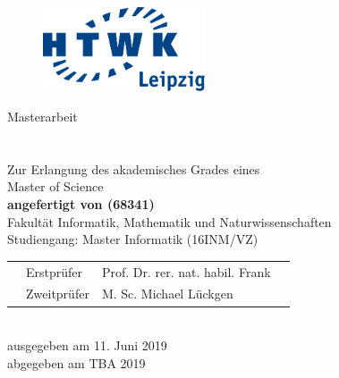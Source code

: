 \makeatletter
\begin{titlepage}
  \vspace{1cm}

  \begin{figure}[h!]
    \centering
    \includegraphics[height=2.5cm]{src/Title/logo_htwk.pdf}
  \end{figure}

  \begin{center}
    \vspace{1cm}

    \begin{onehalfspacing}
      {\Large Masterarbeit} \\[8ex]
      \textbf{
        {\Huge \@title} \\[5ex]
        {\Large \@subtitle} \\[8ex]
      }
      \large
      Zur Erlangung des akademisches Grades eines \\
      Master of Science \\[5ex]
      \vfill
      \textbf{angefertigt von \@author{ }(68341)}\\[5ex]
      \vfill
      Fakultät Informatik, Mathematik und Naturwissenschaften\\
      Studiengang: Master Informatik (16INM/VZ)\\[5ex]
      \vfill
      \begin{tabularx}{\textwidth}{Xm{2.5cm}lX}
        & Erstprüfer & Prof. Dr. rer. nat. habil. Frank &\\
        & Zweitprüfer & M. Sc. Michael Lückgen &
      \end{tabularx} \\[5ex]
      \vfill
      ausgegeben am 11. Juni 2019 \\
      abgegeben am TBA 2019
    \end{onehalfspacing}
  \end{center}
\end{titlepage}
\makeatother
